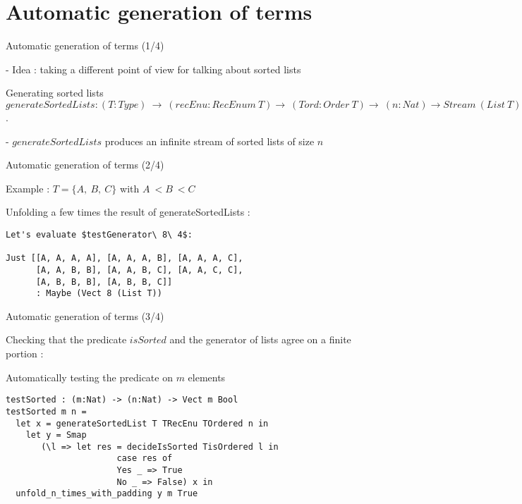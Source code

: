 \documentclass[french]{beamer}
\begin{document}
\section{Automatic generation of terms}
\begin{frame}[fragile]{Automatic generation of terms (1/4)}

		- Idea : taking a different point of view for talking about sorted lists
		
	\begin{block}{Generating sorted lists}	
		$generateSortedLists : (T:Type)\ \rightarrow\ (recEnu:RecEnum\ T) \rightarrow\ (Tord : Order\ T) \rightarrow\ (n:Nat) \rightarrow Stream\ (List\ T)$.
		
	\end{block}	
	
	- $generateSortedLists$ produces an infinite stream of sorted lists of size $n$	
		
\end{frame}



\begin{frame}[fragile]{Automatic generation of terms (2/4)}

Example : $T = \{A,\ B,\ C\}$ with $A\ < B\ < C$	
		
Unfolding a few times the result of generateSortedLists :


\begin{lstlisting}
Let's evaluate $testGenerator\ 8\ 4$:

Just [[A, A, A, A], [A, A, A, B], [A, A, A, C], 
      [A, A, B, B], [A, A, B, C], [A, A, C, C], 
      [A, B, B, B], [A, B, B, C]] 
      : Maybe (Vect 8 (List T))
\end{lstlisting}	

\end{frame}


\begin{frame}[fragile]{Automatic generation of terms (3/4)}

Checking that the predicate $isSorted$ and the generator of lists agree on a finite portion :

	\begin{block}{Automatically testing the predicate on $m$ elements}

\begin{lstlisting}
testSorted : (m:Nat) -> (n:Nat) -> Vect m Bool
testSorted m n = 
  let x = generateSortedList T TRecEnu TOrdered n in
    let y = Smap 
       (\l => let res = decideIsSorted TisOrdered l in
			          case res of
			          Yes _ => True
			          No _ => False) x in
  unfold_n_times_with_padding y m True
\end{lstlisting}

	\end{block}

\end{frame}
\end{document}
